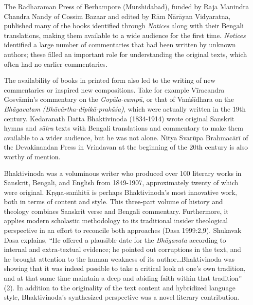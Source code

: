 The Radharaman Press of Berhampore (Murshidabad), funded by Raja Manindra Chandra Nandy of Cossim Bazaar and edited by Rām Nārāyan Vidyaratna, published many of the books identified through {\sl Notices} along with their Bengali translations, making them available to a wide audience for the first time. {\sl Notices} identified a large number of commentaries that had been written by unknown authors; these filled an important role for understanding the original texts, which often had no earlier commentaries. 

The availability of books in printed form also led to the writing of new commentaries or inspired new compositions. Take for example Vīracandra Gosvāmin's commentary on the {\sl Gopāla-campū}, or that of Vaṁśīdhara on the {\sl Bhāgavatam (Bhāvārtha-dīpikā-prakāśa)}, which were actually written in the 19th century. Kedaranath Datta Bhaktivinoda (1834-1914) wrote original Sanskrit hymns and {\sl sūtra} texts with Bengali translations and commentary to make them available to a wider audience, but he was not alone. Nitya Svarūpa Brahmacārī of the Devakinandan Press in Vrindavan at the beginning of the 20th century is also worthy of mention. 
\vskip 2pt

Bhaktivinoda was a voluminous writer who produced over 100 literary works in Sanskrit, Bengali, and English from 1849-1907, approximately twenty of which were original. Kṛṣṇa-saṁhitā is perhaps Bhaktivinoda’s most innovative work, both in terms of content and style. This three-part volume of history and theology combines Sanskrit verse and Bengali commentary. Furthermore, it applies modern scholastic methodology to its traditional insider theological perspective in an effort to reconcile both approaches (Dasa 1999:2,9). Shukavak Dasa explains, “He offered a plausible date for the {\sl Bhāgavata} according to internal and extra-textual evidence; he pointed out corruptions in the text, and he brought attention to the human weakness of its author…Bhaktivinoda was showing that it was indeed possible to take a critical look at one’s own tradition, and at that same time maintain a deep and abiding faith within that tradition” (2). In addition to the originality of the text content and hybridized language style, Bhaktivinoda’s synthesized perspective was a novel literary contribution. 
\vskip 2pt

